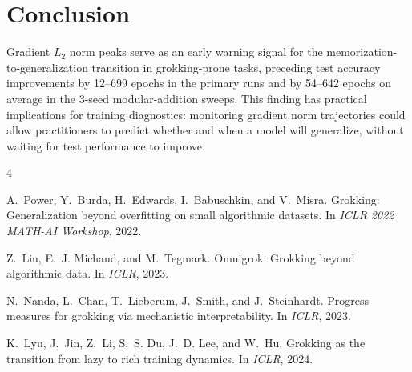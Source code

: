 \documentclass[11pt,a4paper]{article}
\begin{document}
\section{Conclusion}

Gradient $L_2$ norm peaks serve as an early warning signal for the memorization-to-generalization transition in grokking-prone tasks, preceding test accuracy improvements by 12--699 epochs in the primary runs and by 54--642 epochs on average in the 3-seed modular-addition sweeps. This finding has practical implications for training diagnostics: monitoring gradient norm trajectories could allow practitioners to predict whether and when a model will generalize, without waiting for test performance to improve.


\begin{thebibliography}{4}

A.~Power, Y.~Burda, H.~Edwards, I.~Babuschkin, and V.~Misra.
\newblock Grokking: Generalization beyond overfitting on small algorithmic datasets.
\newblock In \emph{ICLR 2022 MATH-AI Workshop}, 2022.

Z.~Liu, E.~J. Michaud, and M.~Tegmark.
\newblock Omnigrok: Grokking beyond algorithmic data.
\newblock In \emph{ICLR}, 2023.

N.~Nanda, L.~Chan, T.~Lieberum, J.~Smith, and J.~Steinhardt.
\newblock Progress measures for grokking via mechanistic interpretability.
\newblock In \emph{ICLR}, 2023.

K.~Lyu, J.~Jin, Z.~Li, S.~S. Du, J.~D. Lee, and W.~Hu.
\newblock Grokking as the transition from lazy to rich training dynamics.
\newblock In \emph{ICLR}, 2024.

\end{thebibliography}
\end{document}
